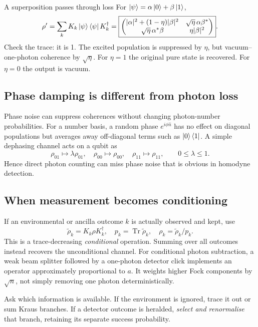 \begin{worked}{A superposition passes through loss}
For \(\left\lvert \psi\right\rangle=\alpha\left\lvert 0\right\rangle+\beta\left\lvert 1\right\rangle\),
\[
\rho'=\sum_kK_k\left\lvert \psi\right\rangle\left\langle \psi\right\rvert K_k^\dagger
=\boxed{\begin{pmatrix}
|\alpha|^2+(1-\eta)|\beta|^2&
\sqrt\eta\,\alpha\beta^*\\
\sqrt\eta\,\alpha^*\beta&
\eta|\beta|^2
\end{pmatrix}}.
\]
Check the trace: it is 1.
The excited population is suppressed by
\(\eta\), but vacuum--one-photon
coherence by \(\sqrt\eta\).
For \(\eta=1\) the original pure state is
recovered. For \(\eta=0\) the output is vacuum.
\end{worked}

\subsection{Phase damping is different from photon loss}
Phase noise can suppress coherences without
changing photon-number probabilities.
For a number basis, a random phase
\(e^{i\phi\hat n}\) has no effect on
diagonal populations but averages away
off-diagonal terms such as \(\left\lvert 0\right\rangle\left\langle 1\right\rvert\).
A simple dephasing channel acts on a qubit as
\[
\rho_{01}\mapsto\lambda\rho_{01},\quad
\rho_{00}\mapsto\rho_{00},\quad
\rho_{11}\mapsto\rho_{11},
\qquad0\le\lambda\le1.
\]
Hence direct photon counting can miss phase
noise that is obvious in homodyne detection.

\subsection{When measurement becomes conditioning}
If an environmental or ancilla outcome \(k\)
is actually observed and kept, use
\[
\tilde\rho_k=K_k\rho K_k^\dagger,\quad
p_k=\operatorname{Tr}\tilde\rho_k,\quad
\boxed{\rho_k=\tilde\rho_k/p_k}.
\]
This is a trace-decreasing \emph{conditional}
operation. Summing over all outcomes instead
recovers the unconditional channel.
For conditional photon subtraction, a weak
beam splitter followed by a one-photon
detector click implements an operator
approximately proportional to \(a\).
It weights higher Fock components by \(\sqrt n\),
not simply removing one photon deterministically.

\begin{checkpoint}
Ask which information is available.
If the environment is ignored, trace it
out or sum Kraus branches. If a detector
outcome is heralded, \emph{select and
renormalise} that branch, retaining its
separate success probability.
\end{checkpoint}

